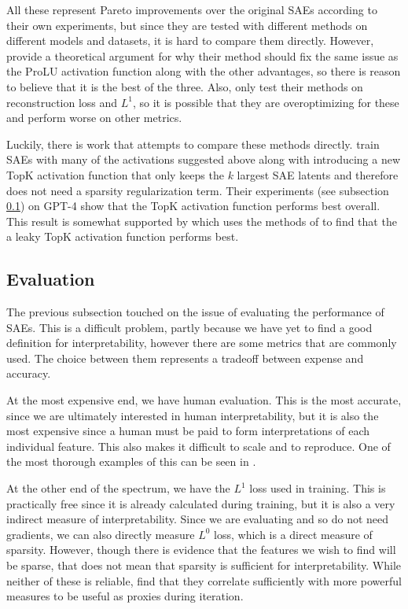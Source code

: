 All these represent Pareto improvements over the original SAEs according to their own experiments, but since they are tested with different methods on different models and datasets, it is hard to compare them directly.
However, \textcite{rajamanoharan_improving_2024} provide a theoretical argument for why their method should fix the same issue as the ProLU activation function along with the other advantages, so there is reason to believe that it is the best of the three.
Also, \textcite{riggs_improving_2024} only test their methods on reconstruction loss and $L^1$, so it is possible that they are overoptimizing for these and perform worse on other metrics.

Luckily, there is work that attempts to compare these methods directly.
\textcite{gao_scaling_2024} train SAEs with many of the activations suggested above along with introducing a new TopK activation function that only keeps the $k$ largest SAE latents and therefore does not need a sparsity regularization term.
Their experiments (see subsection \ref{sec:evaluation}) on GPT-4 \parencite{openai_gpt-4_2024} show that the TopK activation function performs best overall.
This result is somewhat supported by \textcite{quaisley_research_2024} which uses the methods of \textcite{huben_research_2024} to find that the a leaky TopK activation function performs best.



\subsection{Evaluation}
\label{sec:evaluation}
The previous subsection touched on the issue of evaluating the performance of SAEs.
This is a difficult problem, partly because we have yet to find a good definition for interpretability, however there are some metrics that are commonly used.
The choice between them represents a tradeoff between expense and accuracy.

At the most expensive end, we have human evaluation.
This is the most accurate, since we are ultimately interested in human interpretability, but it is also the most expensive since a human must be paid to form interpretations of each individual feature.
This also makes it difficult to scale and to reproduce.
One of the most thorough examples of this can be seen in \textcite{bricken_towards_2023}.

At the other end of the spectrum, we have the $L^1$ loss used in training.
This is practically free since it is already calculated during training, but it is also a very indirect measure of interpretability.
Since we are evaluating and so do not need gradients, we can also directly measure $L^0$ loss, which is a direct measure of sparsity.
However, though there is evidence that the features we wish to find will be sparse, that does not mean that sparsity is sufficient for interpretability.
While neither of these is reliable, \textcite{bricken_towards_2023} find that they correlate sufficiently with more powerful measures to be useful as proxies during iteration.

